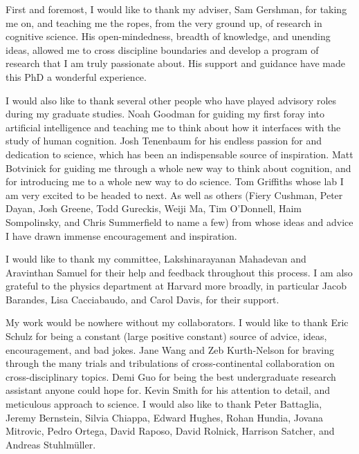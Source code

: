 

First and foremost, I would like to thank my adviser, Sam Gershman, for taking me on, and teaching me the ropes, from the very ground up, of research in cognitive science. His open-mindedness, breadth of knowledge, and unending ideas, allowed me to cross discipline boundaries and develop a program of research that I am truly passionate about. His support and guidance have made this PhD a wonderful experience.

I would also like to thank several other people who have played advisory roles during my graduate studies. Noah Goodman for guiding my first foray into artificial intelligence and teaching me to think about how it interfaces with the study of human cognition. Josh Tenenbaum for his endless passion for and dedication to science, which has been an indispensable source of inspiration. Matt Botvinick for guiding me through a whole new way to think about cognition, and for introducing me to a whole new way to do science. Tom Griffiths whose lab I am very excited to be headed to next. As well as others (Fiery Cushman, Peter Dayan, Josh Greene, Todd Gureckis, Weiji Ma, Tim O'Donnell, Haim Sompolinsky, and Chris Summerfield to name a few) from whose ideas and advice I have drawn immense encouragement and inspiration.

I would like to thank my committee, Lakshinarayanan Mahadevan and Aravinthan Samuel for their help and feedback throughout this process. I am also grateful to the physics department at Harvard more broadly, in particular Jacob Barandes, Lisa Cacciabaudo, and Carol Davis, for their support.

My work would be nowhere without my collaborators. I would like to thank Eric Schulz for being a constant (large positive constant) source of advice, ideas, encouragement, and bad jokes. Jane Wang and Zeb Kurth-Nelson for braving through the many trials and tribulations of cross-continental collaboration on cross-disciplinary topics. Demi Guo for being the best undergraduate research assistant anyone could hope for. Kevin Smith for his attention to detail, and meticulous approach to science. I would also like to thank Peter Battaglia, Jeremy Bernstein, Silvia Chiappa, Edward Hughes, Rohan Hundia,  Jovana Mitrovic, Pedro Ortega, David Raposo, David Rolnick, Harrison Satcher, and Andreas Stuhlmüller.

